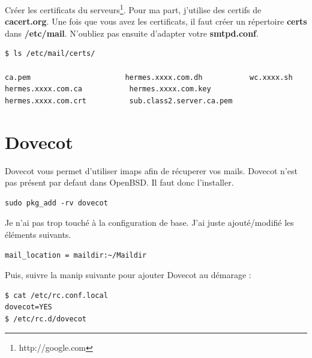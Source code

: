 \documentclass[a4paper,11pt]{article}
\begin{document}
\vspace{5mm}
Créer les certificats du serveurs\footnote{http://google.com}. Pour ma part, j'utilise des certifs de
{\bf cacert.org}. Une fois que vous avez les certificats, il faut créer un répertoire
{\bf certs} dans {\bf /etc/mail}. N'oubliez pas ensuite d'adapter votre {\bf smtpd.conf}. 

\vspace{5mm}
\begin{lstlisting}[language=bash,caption={Préparation d'OpenSMTPd},frame=bt,breaklines=true]
$ ls /etc/mail/certs/

ca.pem                      hermes.xxxx.com.dh           wc.xxxx.sh
hermes.xxxx.com.ca           hermes.xxxx.com.key
hermes.xxxx.com.crt          sub.class2.server.ca.pem 
\end{lstlisting}

\vspace{5mm}
\section*{Dovecot}

Dovecot vous permet d'utiliser imaps afin de récuperer vos mails. Dovecot n'est pas présent par defaut dans OpenBSD. Il faut 
donc l'installer.

\vspace{5mm}
\begin{lstlisting}[caption={/etc/pf.conf},frame=bt,breaklines=true]
sudo pkg_add -rv dovecot
\end{lstlisting}

\vspace{5mm}
Je n'ai pas trop touché à la configuration de base. J'ai juste ajouté/modifié les éléments suivants.

\vspace{5mm}
\begin{lstlisting}[caption={/etc/dovecot/conf.d/10-mail.conf},frame=bt,breaklines=true]
mail_location = maildir:~/Maildir
\end{lstlisting}

\vspace{5mm}
Puis, suivre la manip suivante pour ajouter Dovecot au démarage :

\vspace{5mm}
\begin{lstlisting}[caption={Dovecot au boot},frame=bt,breaklines=true]
$ cat /etc/rc.conf.local                                                                                                                                                   
dovecot=YES
$ /etc/rc.d/dovecot
\end{lstlisting}
\end{document}
